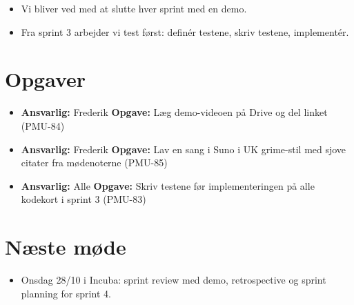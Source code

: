 \documentclass[a4paper,11pt]{article}
\begin{document}
\begin{itemize}
    \item Vi bliver ved med at slutte hver sprint med en demo.
    \item Fra sprint 3 arbejder vi test først: definér testene, skriv testene, implementér.
\end{itemize}

\section*{Opgaver}

\begin{itemize}
    \item \textbf{Ansvarlig:} Frederik \textbf{Opgave:} Læg demo-videoen på Drive og del linket (PMU-84)
    \item \textbf{Ansvarlig:} Frederik \textbf{Opgave:} Lav en sang i Suno i UK grime-stil med sjove citater fra mødenoterne (PMU-85)
    \item \textbf{Ansvarlig:} Alle \textbf{Opgave:} Skriv testene før implementeringen på alle kodekort i sprint 3 (PMU-83)
\end{itemize}

\section*{Næste møde}

\begin{itemize}
    \item Onsdag 28/10 i Incuba: sprint review med demo, retrospective og sprint planning for sprint 4.
\end{itemize}
\end{document}
